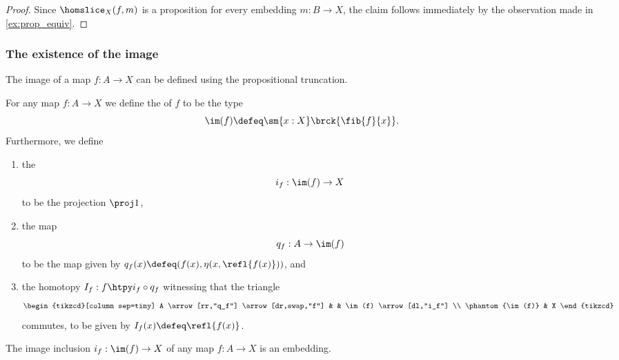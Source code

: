 \begin{proof}
Since $\homslice_X(f,m)$ is a proposition for every embedding $m:B\to X$, the claim follows immediately by the observation made in \cref{ex:prop_equiv}.
\end{proof}

\subsubsection*{The existence of the image}

The image of a map $f:A\to X$ can be defined using the propositional truncation.

\begin{defn}\label{defn:im}
For any map $f:A\to X$ we define the  of $f$ to be the type
\begin{equation*}
\im(f) \defeq \sm{x:X}\brck{\fib{f}{x}}.
\end{equation*}
Furthermore, we define
\begin{enumerate}
\item the 
  \begin{equation*}
    i_f:\im(f)\to X
  \end{equation*}
  to be the projection $\proj 1$,
\item the map
  \begin{equation*}
    q_f:A\to\im(f)
  \end{equation*}
  to be the map given by $q_f(x)\defeq(f(x),\eta(x,\refl{f(x)}))$, and
\item the homotopy $I_f:f\htpy i_f\circ q_f$ witnessing that the triangle
  \begin{equation*}
    \begin{tikzcd}[column sep=tiny]
      A \arrow[rr,"q_f"] \arrow[dr,swap,"f"] & & \im(f) \arrow[dl,"i_f"] \\
      \phantom{\im(f)} & X
    \end{tikzcd}
  \end{equation*}
  commutes, to be given by $I_f(x)\defeq\refl{f(x)}$.
\end{enumerate}
\end{defn}

\begin{prp}
  The image inclusion $i_f:\im(f)\to X$ of any map $f:A\to X$ is an embedding.
\end{prp}


